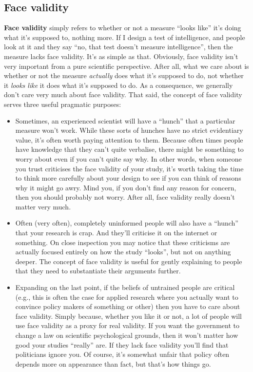 \documentclass[
  a4paper,
]{book}
\providecommand{\tightlist}{%
  \setlength{\itemsep}{0pt}\setlength{\parskip}{0pt}}
\begin{document}
\subsection{Face validity}\label{face-validity}

\textbf{Face validity} simply refers to whether or not a measure ``looks
like'' it's doing what it's supposed to, nothing more. If I design a
test of intelligence, and people look at it and they say ``no, that test
doesn't measure intelligence'', then the measure lacks face validity.
It's as simple as that. Obviously, face validity isn't very important
from a pure scientific perspective. After all, what we care about is
whether or not the measure \emph{actually} does what it's supposed to
do, not whether it \emph{looks like} it does what it's supposed to do.
As a consequence, we generally don't care very much about face validity.
That said, the concept of face validity serves three useful pragmatic
purposes:

\begin{itemize}
\tightlist
\item
  Sometimes, an experienced scientist will have a ``hunch'' that a
  particular measure won't work. While these sorts of hunches have no
  strict evidentiary value, it's often worth paying attention to them.
  Because often times people have knowledge that they can't quite
  verbalise, there might be something to worry about even if you can't
  quite say why. In other words, when someone you trust criticises the
  face validity of your study, it's worth taking the time to think more
  carefully about your design to see if you can think of reasons why it
  might go awry. Mind you, if you don't find any reason for concern,
  then you should probably not worry. After all, face validity really
  doesn't matter very much.
\item
  Often (very often), completely uninformed people will also have a
  ``hunch'' that your research is crap. And they'll criticise it on the
  internet or something. On close inspection you may notice that these
  criticisms are actually focused entirely on how the study ``looks'',
  but not on anything deeper. The concept of face validity is useful for
  gently explaining to people that they need to substantiate their
  arguments further.
\item
  Expanding on the last point, if the beliefs of untrained people are
  critical (e.g., this is often the case for applied research where you
  actually want to convince policy makers of something or other) then
  you have to care about face validity. Simply because, whether you like
  it or not, a lot of people will use face validity as a proxy for real
  validity. If you want the government to change a law on scientific
  psychological grounds, then it won't matter how good your studies
  ``really'' are. If they lack face validity you'll find that
  politicians ignore you. Of course, it's somewhat unfair that policy
  often depends more on appearance than fact, but that's how things go.
\end{itemize}
\end{document}
